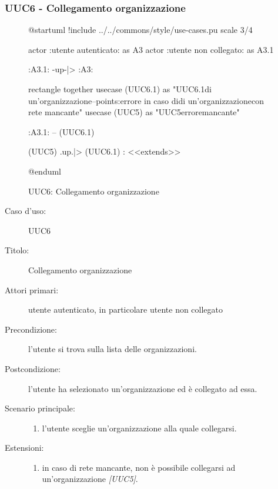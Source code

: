 \documentclass[casi-duso]{subfiles}
\begin{document}
\subsubsection{UUC6 - Collegamento organizzazione}%
\label{subsub:UUC6utente}

\begin{figure}[h!]
  \centering
  \begin{plantuml}
  @startuml
  !include ../../commons/style/use-cases.pu
  scale 3/4

  actor :utente autenticato: as A3
  actor :utente non collegato: as A3.1

  :A3.1: -up-|> :A3:

  rectangle {
    together {
      usecase (UUC6.1) as "UUC6.1\nSelezionamento di un'organizzazione\n--\nExtension points:\nVisualizzazione errore in caso di\nselezionamento di un'organizzazione\n con rete mancante"
      usecase (UUC5) as "UUC5\nVisualizzazione errore\nrete mancante"
    }
  }

  :A3.1: -- (UUC6.1)

  (UUC5) .up.|> (UUC6.1) : <<extends>>

  @enduml
  \end{plantuml}
  \caption{UUC6: Collegamento organizzazione}
  \label{fig:uuc6}
\end{figure}

\begin{description}
  \item[Caso d’uso:] UUC6
  \item[Titolo:] Collegamento organizzazione
  \item[Attori primari:] utente autenticato, in particolare utente non collegato
  \item[Precondizione:] l'utente si trova sulla lista delle organizzazioni.
  \item[Postcondizione:] l'utente ha selezionato un'organizzazione ed è collegato ad essa.
  \item[Scenario principale:]
        \begin{enumerate}
          \item l'utente sceglie un'organizzazione alla quale collegarsi.
        \end{enumerate}
  \item[Estensioni:]
        \begin{enumerate}
          \item in caso di rete mancante, non è possibile collegarsi ad un'organizzazione \emph{[UUC5]}.
        \end{enumerate}
\end{description}
\end{document}
